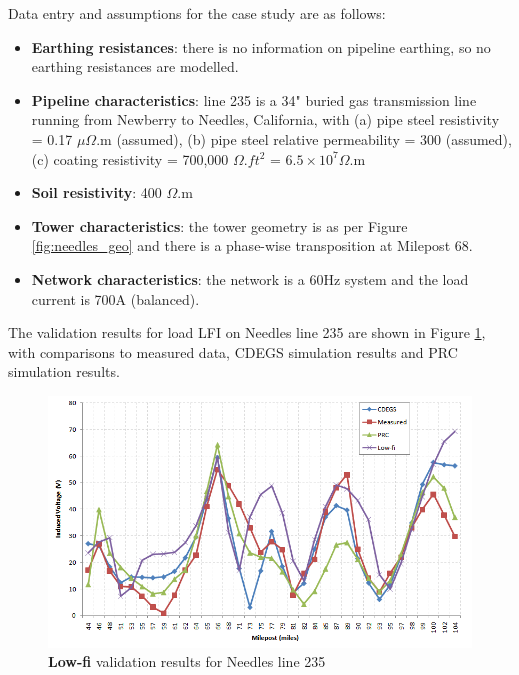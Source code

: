 \documentclass{article}
\begin{document}
Data entry and assumptions for the case study are as follows:
\begin{itemize}
\item \textbf{Earthing resistances}: there is no information on pipeline earthing, so no earthing resistances are modelled. 
\item \textbf{Pipeline characteristics}: line 235 is a 34" buried gas transmission line running from Newberry to Needles, California, with (a) pipe steel resistivity = 0.17 $\mu\Omega$.m (assumed), (b) pipe steel relative permeability = 300 (assumed), (c) coating resistivity = 700,000 $\Omega.ft^{2}$ = $6.5 \times 10^{7} \Omega$.m
\item \textbf{Soil resistivity}: 400 $\Omega$.m
\item \textbf{Tower characteristics}: the tower geometry is as per Figure \ref{fig:needles_geo} and there is a phase-wise transposition at Milepost 68.
\item \textbf{Network characteristics}: the network is a 60Hz system and the load current is 700A (balanced).
\end{itemize}

The validation results for load LFI on Needles line 235 are shown in Figure \ref{fig:needles_comparison}, with comparisons to measured data, CDEGS simulation results and PRC simulation results.

\begin{figure}[!htp]
\begin{center}
\caption{\textbf{Low-fi} validation results for Needles line 235}
\label{fig:needles_comparison}
\includegraphics[width=\linewidth]{./Figures/needles_comparison.png}
\end{center}
\end{figure}
\end{document}
